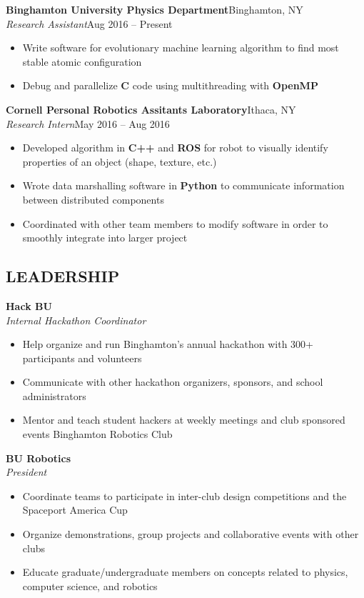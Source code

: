\documentclass[10pt]{article}
\begin{document}
\textbf{Binghamton University Physics Department}\hfill Binghamton, NY \\
\textit{Research Assistant}\hfill Aug 2016 – Present
\begin{itemize}
	\item Write software for evolutionary machine learning algorithm to find most stable atomic configuration
	\item Debug and parallelize \textbf{C} code using multithreading with \textbf{OpenMP}
\end{itemize}

\textbf{Cornell Personal Robotics Assitants Laboratory}\hfill Ithaca, NY \\
\textit{Research Intern}\hfill May 2016 – Aug 2016
\begin{itemize}
	\item Developed algorithm in \textbf{C++} and \textbf{ROS} for robot to visually identify properties of an object (shape, texture, etc.)
	\item Wrote data marshalling software in \textbf{Python} to communicate information between distributed components
	\item Coordinated with other team members to modify software in order to smoothly integrate into larger project
\end{itemize}
\vspace{-1mm}
\subsection*{LEADERSHIP}
\spacedhrule{-0.1em}{0.9em}

\textbf{Hack BU} \\
\textit{Internal Hackathon Coordinator}
\begin{itemize}
	\item Help organize and run Binghamton's annual hackathon with 300+ participants and volunteers
	\item Communicate with other hackathon organizers, sponsors, and school administrators
	\item Mentor and teach student hackers at weekly meetings and club sponsored events Binghamton Robotics Club
\end{itemize}

\textbf{BU Robotics}\\
\textit{President}
\begin{itemize}
	\item Coordinate teams to participate in inter-club design competitions and the Spaceport America Cup
	\item Organize demonstrations, group projects and collaborative events with other clubs
	\item Educate graduate/undergraduate members on concepts related to physics, computer science, and robotics
\end{itemize}
\vspace{-1mm}
\end{document}
